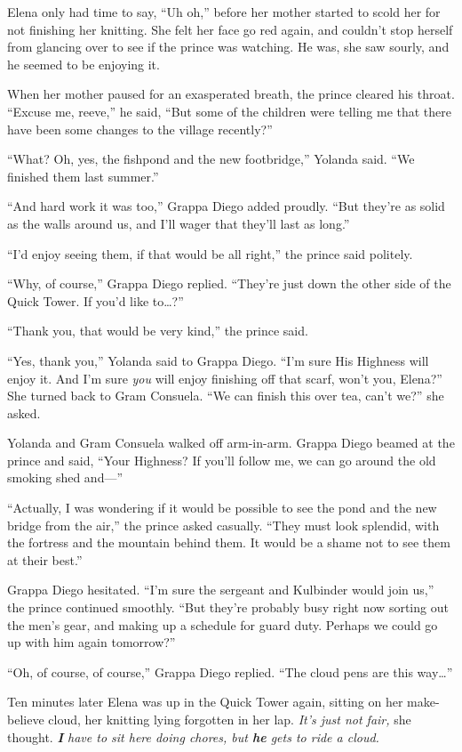 \documentclass[10pt]{book}
\begin{document}
Elena only had time to say, ``Uh oh,'' before her mother started to scold her for not finishing her knitting. She felt her face go red again, and couldn't stop herself from glancing over to see if the prince was watching. He was, she saw sourly, and he seemed to be enjoying it.

When her mother paused for an exasperated breath, the prince cleared his throat. ``Excuse me, reeve,'' he said, ``But some of the children were telling me that there have been some changes to the village recently?''

``What? Oh, yes, the fishpond and the new footbridge,'' Yolanda said. ``We finished them last summer.''

``And hard work it was too,'' Grappa Diego added proudly. ``But they're as solid as the walls around us, and I'll wager that they'll last as long.''

``I'd enjoy seeing them, if that would be all right,'' the prince said politely.

``Why, of course,'' Grappa Diego replied. ``They're just down the other side of the Quick Tower. If you'd like to{\ldots}?''

``Thank you, that would be very kind,'' the prince said.

``Yes, thank you,'' Yolanda said to Grappa Diego. ``I'm sure His Highness will enjoy it. And I'm sure \emph{you} will enjoy finishing off that scarf, won't you, Elena?'' She turned back to Gram Consuela. ``We can finish this over tea, can't we?'' she asked.

Yolanda and Gram Consuela walked off arm-in-arm. Grappa Diego beamed at the prince and said, ``Your Highness? If you'll follow me, we can go around the old smoking shed and---''

``Actually, I was wondering if it would be possible to see the pond and the new bridge from the air,'' the prince asked casually. ``They must look splendid, with the fortress and the mountain behind them. It would be a shame not to see them at their best.''

Grappa Diego hesitated. ``I'm sure the sergeant and Kulbinder would join us,'' the prince continued smoothly. ``But they're probably busy right now sorting out the men's gear, and making up a schedule for guard duty. Perhaps we could go up with him again tomorrow?''

``Oh, of course, of course,'' Grappa Diego replied. ``The cloud pens are this way{\ldots}''

Ten minutes later Elena was up in the Quick Tower again, sitting on her make-believe cloud, her knitting lying forgotten in her lap. \emph{It's just not fair,} she thought. \emph{{\bf I} have to sit here doing chores, but {\bf he} gets to ride a cloud.}
\end{document}

